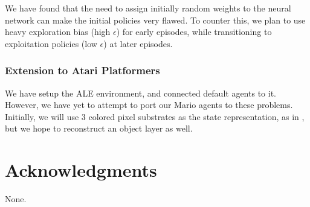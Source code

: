 \documentclass{article}
\begin{document}
We have found that the need to assign initially random weights to the neural network can make the initial policies very flawed. To counter this, we plan to use heavy exploration bias (high $\epsilon$) for early episodes, while transitioning to exploitation policies (low $\epsilon$) at later episodes.

\subsubsection{Extension to Atari Platformers}
We have setup the ALE environment, and connected default agents to it. However, we have yet to attempt to port our Mario agents to these problems. Initially, we will use 3 colored pixel substrates as the state representation, as in \cite{Hauskneck13}, but we hope to reconstruct an object layer as well.
 
\section*{Acknowledgments} 
 
None.



\end{document}
